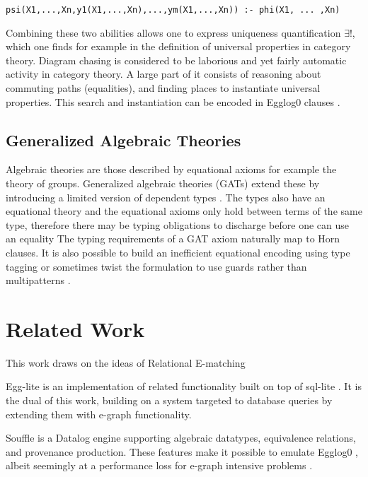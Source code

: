 \documentclass[sigplan,10pt,review]{acmart} %
\begin{document}
\begin{lstlisting}
psi(X1,...,Xn,y1(X1,...,Xn),...,ym(X1,...,Xn)) :- phi(X1, ... ,Xn)
\end{lstlisting}

Combining these two abilities allows one to express uniqueness quantification $\exists!$, which one finds for example in the definition of universal properties in category theory. Diagram chasing is considered to be laborious and yet fairly automatic activity in category theory. A large part of it consists of reasoning about commuting paths (equalities), and finding places to instantiate universal properties\cite{catnapp}. This search and instantiation can be encoded in Egglog0 clauses \cite{pullback, pullback2}.

\subsection{Generalized Algebraic Theories}
Algebraic theories are those described by equational axioms for example the theory of groups. Generalized algebraic theories (GATs) extend these by introducing a limited version of dependent types \cite{catlab, cartmell}. The types also have an equational theory and the equational axioms only hold between terms of the same type, therefore there may be typing obligations to discharge before one can use an equality
The typing requirements of a GAT axiom naturally map to Horn clauses. It is also possible to build an inefficient equational encoding using type tagging\cite{typetag} or sometimes twist the formulation to use guards rather than multipatterns \cite{monoidal}.

\section{Related Work}
This work draws on the ideas of Relational E-matching \cite{rel_ematch}

Egg-lite is an implementation of related functionality built on top of sql-lite \cite{egg-lite}. It is the dual of this work, building on a system targeted to database queries by extending them with e-graph functionality.

Souffle\cite{souffle} is a Datalog engine supporting algebraic datatypes, equivalence relations, and provenance production. These features make it possible to emulate Egglog0 \cite{naivesouffle}, albeit seemingly at a performance loss for e-graph intensive problems \cite{soufflehack}.
\end{document}
